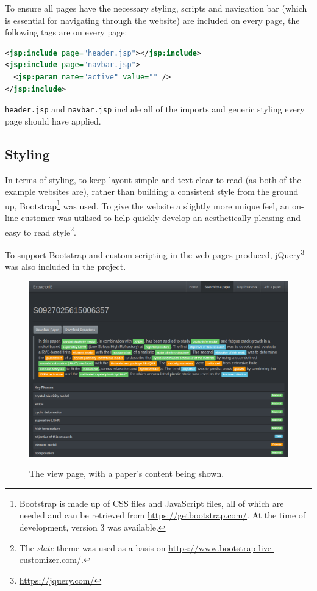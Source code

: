To ensure all pages have the necessary styling, scripts and navigation bar (which is essential for navigating through the website) are included on every page, the following tags are on every page:

\begin{lstlisting}[language=XML]
<jsp:include page="header.jsp"></jsp:include>
<jsp:include page="navbar.jsp">
  <jsp:param name="active" value="" />
</jsp:include>
\end{lstlisting}

\texttt{header.jsp} and \texttt{navbar.jsp} include all of the imports and generic styling every page should have applied.

\subsection*{Styling}
In terms of styling, to keep layout simple and text clear to read (as both of the example websites are), rather than building a consistent style from the ground up, Bootstrap\footnote{Bootstrap is made up of CSS files and JavaScript files, all of which are needed and can be retrieved from \href{https://getbootstrap.com/}{https://getbootstrap.com/}. At the time of development, version 3 was available.} was used. To give the website a slightly more unique feel, an on-line customer was utilised to help quickly develop an aesthetically pleasing and easy to read style\footnote{The \textit{slate} theme was used as a basis on \href{https://www.bootstrap-live-customizer.com/}{https://www.bootstrap-live-customizer.com/}.}.

To support Bootstrap and custom scripting in the web pages produced, jQuery\footnote{\href{https://jquery.com/}{https://jquery.com/}} was also included in the project.

\begin{figure}
	\centering
	\includegraphics[width=12cm]{img/extractorie-view.png} \\
	\caption[An example view page of the website]{The view page, with a paper's content being shown.}
	\label{figure:extractorieview}
\end{figure}

